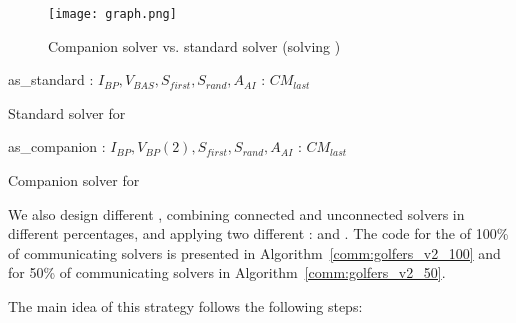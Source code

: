 \begin{figure}
\centering
\texttt{[image: graph.png]} 
\caption{Companion solver vs. standard solver (solving \sgp)}
\label{fig:solversgolfers}
\end{figure}

\begin{algorithm}[h]
\dontprintsemicolon
\SetNoline
{}
   as\_standard\;
\algoindent {} : $I_{BP}, V_{BAS}, S_{first}, S_{rand}, A_{AI}$ \;
\algoindent {} : $CM_{last}$ \;
\caption{Standard solver for \SGP}\label{as:golfers_full}
\end{algorithm}

\begin{algorithm}[!h]
\dontprintsemicolon
\SetNoline
{}
   as\_companion\;
\algoindent {} : $I_{BP}, V_{BP}(2), S_{first}, S_{rand}, A_{AI}$ \;
\algoindent {} : $CM_{last}$ \;
\caption{Companion solver for \SGP}\label{as:golfers_partial}
\end{algorithm}

We also design different \commstrs, combining connected and unconnected solvers in different percentages, and applying two different \commopers: \oneTone{} and \oneTn. The code for the \commstr{} of 100\% of communicating solvers is presented in Algorithm~\ref{comm:golfers_v2_100} and for 50\% of communicating solvers in Algorithm~\ref{comm:golfers_v2_50}. 

The main idea of this strategy follows the following steps:

